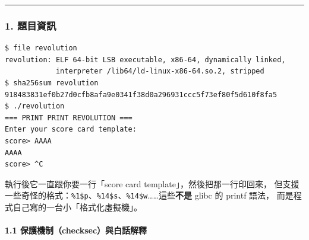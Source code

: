 \documentclass[10pt,a4paper]{article}
\begin{document}
\begin{center}\rule{0.5\linewidth}{0.5pt}\end{center}

\subsubsection{1. 題目資訊}\label{ux984cux76eeux8cc7ux8a0a-2}

\begin{Verbatim}[breaklines=true,breakanywhere=true,breakautoindent=false,fontsize=\fontsize{7.0}{9.5}\selectfont]
$ file revolution
revolution: ELF 64-bit LSB executable, x86-64, dynamically linked,
            interpreter /lib64/ld-linux-x86-64.so.2, stripped
$ sha256sum revolution
918483831ef0b27d0cfb8afa9e0341f38d0a296931ccc5f73ef80f5d610f8fa5
$ ./revolution
=== PRINT PRINT REVOLUTION ===
Enter your score card template:
score> AAAA
AAAA
score> ^C
\end{Verbatim}

執行後它一直跟你要一行「score card template」，然後把那一行印回來，
但支援一些奇怪的格式：\texttt{\%\allowbreak{}1\$\allowbreak{}p}、\texttt{\%\allowbreak{}14\$\allowbreak{}s}、\texttt{\%\allowbreak{}14\$\allowbreak{}w}\ldots\ldots 這些\textbf{不是}
glibc 的 printf 語法， 而是程式自己寫的一台小「格式化虛擬機」。

\paragraph{1.1
保護機制（checksec）與白話解釋}\label{ux4fddux8b77ux6a5fux5236checksecux8207ux767dux8a71ux89e3ux91cb}
\end{document}
